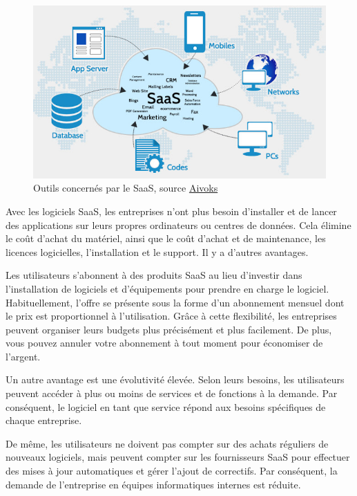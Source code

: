 \documentclass[pfe]{tnreport} %
\begin{document}
\begin{figure}[h]
  \centering
  \includegraphics[width=15cm]{figures/saas-5.jpg}
  \caption{Outils concernés par le SaaS, source 
  \href{https://www.aivoks.com/saas-development.php}{Aivoks}}
  \label{fig:famille}
\end{figure}

Avec les logiciels SaaS, les entreprises n'ont plus besoin d'installer et de lancer des applications sur leurs propres ordinateurs ou centres de données. Cela élimine le coût d'achat du matériel, ainsi que le coût d'achat et de maintenance, les licences logicielles, l'installation et le support. Il y a d'autres avantages.

Les utilisateurs s'abonnent à des produits SaaS au lieu d'investir dans l'installation de logiciels et d'équipements pour prendre en charge le logiciel. Habituellement, l'offre se présente sous la forme d'un abonnement mensuel dont le prix est proportionnel à l'utilisation. Grâce à cette flexibilité, les entreprises peuvent organiser leurs budgets plus précisément et plus facilement. De plus, vous pouvez annuler votre abonnement à tout moment pour économiser de l'argent.

Un autre avantage est une évolutivité élevée. Selon leurs besoins, les utilisateurs peuvent accéder à plus ou moins de services et de fonctions à la demande. Par conséquent, le logiciel en tant que service répond aux besoins spécifiques de chaque entreprise.

De même, les utilisateurs ne doivent pas compter sur des achats réguliers de nouveaux logiciels, mais peuvent compter sur les fournisseurs SaaS pour effectuer des mises à jour automatiques et gérer l'ajout de correctifs. Par conséquent, la demande de l'entreprise en équipes informatiques internes est réduite.
\end{document}
